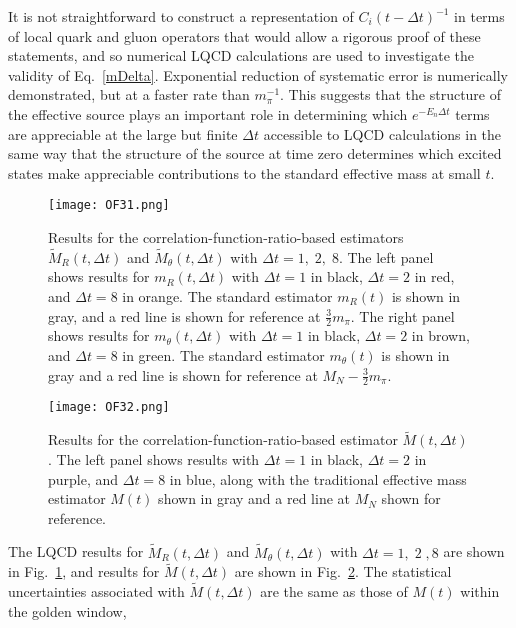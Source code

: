   It is not straightforward to construct a representation of $C_i(t-\Delta t)^{-1}$ in terms of local quark and gluon operators that would allow a rigorous proof of these statements, and so numerical LQCD calculations are used to investigate the validity of Eq.~\eqref{mDelta}.
  Exponential reduction of systematic error is numerically demonstrated, but at a faster rate than $m_\pi^{-1}$.
  This suggests that the structure of the effective source plays an important role in determining which $e^{-E_n \Delta t}$ terms are appreciable at the large but finite $\Delta t$ accessible to LQCD calculations in the same way that the structure of the source at time zero determines which excited states make appreciable contributions to the standard effective mass at small $t$.



%
\begin{figure}[!ht]
  \centering
  \texttt{[image: OF31.png]}
  \caption{
    Results for the correlation-function-ratio-based estimators $\tilde{M}_R(t, \Delta t)$ and $\tilde{M}_\theta(t, \Delta t)$ with $\Delta t = 1,\;2,\;8$. 
  The left panel shows results for $m_R(t, \Delta t)$ with $\Delta t = 1$ in black, $\Delta t = 2$ in red, and $\Delta t = 8$ in orange. 
  The standard estimator $m_R(t)$ is shown in gray, and a red line is shown for reference at $\frac{3}{2}m_\pi$. 
  The right panel shows results for $m_\theta(t, \Delta t)$ with $\Delta t = 1$ in black, $\Delta t = 2$ in brown, and $\Delta t = 8$ in green. 
  The standard estimator $m_\theta(t)$ is shown in gray and a red line is shown for reference at $M_N - \frac{3}{2}m_\pi$.
  }
  \label{RThWEM}
\end{figure}
%
\begin{figure}[!ht]
  \centering
  \texttt{[image: OF32.png]}
  \caption{
    Results for the correlation-function-ratio-based estimator $\tilde{M}(t, \Delta t)$. 
  The left panel shows results with $\Delta t =1$ in black, $\Delta t =2$ in purple, and $\Delta t = 8$ in blue, 
  along with the traditional effective mass estimator $M(t)$  shown in gray and a red line at $M_N$ shown for reference. 
  }
  \label{WEM}
\end{figure}
%
The LQCD results for $\tilde{M}_R(t, \Delta t)$ and $\tilde{M}_\theta(t, \Delta t)$ with $\Delta t = 1,\;2\;,8$ are shown in Fig.~\ref{RThWEM}, 
and results for  $\tilde{M}(t,\Delta t)$ are shown in Fig.~\ref{WEM}. 
The statistical uncertainties associated with $\tilde{M}(t, \Delta t)$ are the same as  those of $M(t)$ within the golden window, 
